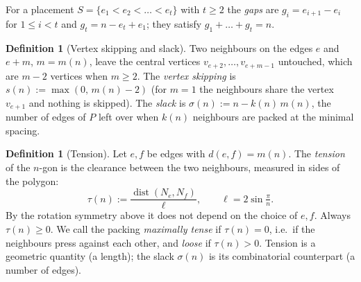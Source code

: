 \documentclass[11pt,a4paper]{article}
\theoremstyle{definition}
\newtheorem{definition}[theorem]{Definition}
\theoremstyle{remark}
\DeclareMathOperator{\dist}{dist}
\begin{document}
For a placement $S=\{e_1<e_2<\dots<e_t\}$ with $t\ge2$ the \emph{gaps} are $g_i=e_{i+1}-e_i$ for $1\le i<t$ and $g_t=n-e_t+e_1$; they satisfy $g_1+\dots+g_t=n$.

\begin{definition}[Vertex skipping and slack]\label{def:skip}
Two neighbours on the edges $e$ and $e+m$, $m=m(n)$, leave the central vertices $v_{e+2},\dots,v_{e+m-1}$ untouched, which are $m-2$ vertices when $m\ge2$.
The \emph{vertex skipping} is $s(n):=\max(0,\,m(n)-2)$ (for $m=1$ the neighbours share the vertex $v_{e+1}$ and nothing is skipped).
The \emph{slack} is $\sigma(n):=n-k(n)\,m(n)$, the number of edges of $P$ left over when $k(n)$ neighbours are packed at the minimal spacing.
\end{definition}

\begin{definition}[Tension]\label{def:tension}
Let $e,f$ be edges with $d(e,f)=m(n)$. The \emph{tension} of the $n$-gon is the clearance between the two neighbours, measured in sides of the polygon:
\[
\tau(n):=\frac{\dist(N_e,N_f)}{\ell},\qquad \ell=2\sin\tfrac\pi n .
\]
By the rotation symmetry above it does not depend on the choice of $e,f$. Always $\tau(n)\ge0$. We call the packing \emph{maximally tense} if $\tau(n)=0$, i.e.\ if the neighbours press against each other,
and \emph{loose} if $\tau(n)>0$. Tension is a geometric quantity (a length); the slack $\sigma(n)$ is its combinatorial counterpart (a number of edges).
\end{definition}
\end{document}
